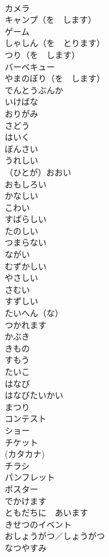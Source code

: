 \documentclass[8pt]{extreport}
\begin{document}
\begin{CJK}{UTF8}{min}
\\	カメラ	
\\	キャンプ（を　します）	
\\	ゲーム	
\\	しゃしん（を　とります）	
\\	つり（を　します）	
\\	バーベキュー	
\\	やまのぼり（を　します）	
\\	でんとうぶんか	
\\	いけばな	
\\	おりがみ	
\\	さどう	
\\	はいく	
\\	ぼんさい	
\\	うれしい	
\\	（ひとが）おおい	
\\	おもしろい	
\\	かなしい	
\\	こわい	
\\	すばらしい	
\\	たのしい	
\\	つまらない	
\\	ながい	
\\	むずかしい	
\\	やさしい	
\\	さむい	
\\	すずしい	
\\	たいへん（な）	
\\	つかれます	
\\	かぶき	
\\	きもの	
\\	すもう	
\\	たいこ	
\\	はなび	
\\	はなびたいかい	
\\	まつり	
\\	コンテスト	
\\	ショー	
\\	チケット	
\\	(カタカナ)
\\	チラシ	
\\	パンフレット	
\\	ポスター	
\\	でかけます	
\\	ともだちに　あいます	
\\	きせつのイベント	
\\	おしょうがつ／しょうがつ	
\\	なつやすみ	

\end{CJK}
\end{document}
